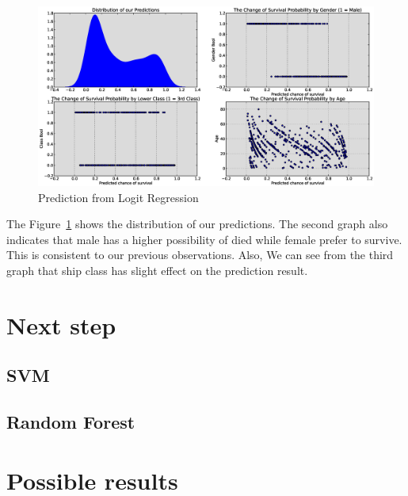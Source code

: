 \documentclass{article}
\begin{document}
\begin{figure}[h]
\begin{flushleft}
\hspace*{-1.2in}
\includegraphics[scale=0.4]{eps/prediction.eps} %
\caption{Prediction from Logit Regression}
\label {fig:pre}
\end{flushleft}
\end{figure}


The Figure~\ref{fig:pre} shows the distribution of our predictions. The second graph also indicates that male has a higher possibility of died while female prefer to survive. This is consistent to our previous observations. Also, We can see from the third graph that ship class has slight effect on the prediction result.




\section{Next step}

\subsection{SVM}

\subsection{Random Forest}




\section{Possible results}
\end{document}
